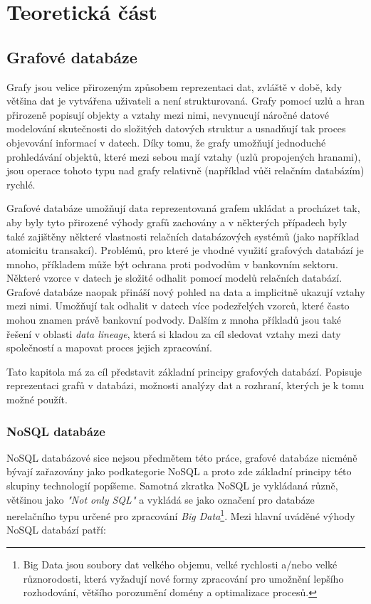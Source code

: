 \chapter{Teoretická část}

\section{Grafové databáze}
\label{sec:gdb}

Grafy jsou velice přirozeným způsobem reprezentaci dat, zvláště v době, kdy většina dat je vytvářena uživateli a není strukturovaná. Grafy pomocí uzlů a hran přirozeně popisují objekty a vztahy mezi nimi, nevynucují náročné datové modelování skutečnosti do složitých datových struktur a usnadňují tak proces objevování informací v datech. Díky tomu, že grafy umožňují jednoduché prohledávání objektů, které mezi sebou mají vztahy (uzlů propojených hranami), jsou operace tohoto typu nad grafy relativně (například vůči relačním databázím) rychlé. 

Grafové databáze umožňují data reprezentovaná grafem ukládat a procházet tak, aby byly tyto přirozené výhody grafů zachovány a v některých případech byly také zajištěny některé vlastnosti relačních databázových systémů (jako například atomicitu transakcí). Problémů, pro které je vhodné využití grafových databází je mnoho, příkladem může být ochrana proti podvodům v bankovním sektoru. Některé vzorce v datech je složité odhalit pomocí modelů relačních databází. Grafové databáze naopak přináší nový pohled na data a implicitně ukazují vztahy mezi nimi. Umožňují tak odhalit v datech více podezřelých vzorců, které často mohou znamen právě bankovní podvody.\cite{Webber17} Dalším z mnoha příkladů jsou také řešení v oblasti \textit{data lineage}, která si kladou za cíl sledovat vztahy mezi daty společností a mapovat proces jejich zpracování. 

Tato kapitola má za cíl představit základní principy grafových databází. Popisuje reprezentaci grafů v databázi, možnosti analýzy dat a rozhraní, kterých je k tomu možné použít.

\subsection{NoSQL databáze}
\label{sec:gdb-nosql}
NoSQL databázové sice nejsou předmětem této práce, grafové databáze nicméně bývají zařazovány jako podkategorie NoSQL a proto zde základní principy této skupiny technologií popíšeme. Samotná zkratka NoSQL je vykládaná různě, většinou jako \textit{"Not only SQL"} \cite{Evans09} a vykládá se jako označení pro databáze nerelačního typu určené pro zpracování \textit{Big Data}\footnote{Big Data jsou soubory dat velkého objemu, velké rychlosti a/nebo velké různorodosti, která vyžadují nové formy zpracování pro umožnění lepšího rozhodování, většího porozumění domény a optimalizace procesů.\cite{Laney01}}. Mezi hlavní uváděné výhody NoSQL databází patří: 

